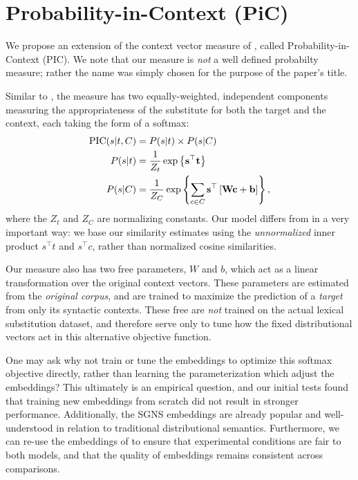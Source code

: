 \section{Probability-in-Context (PiC)}

We propose an extension of the context vector measure of
, called Probability-in-Context (PIC).  We note that
our measure is {\em not} a well defined probabilty measure; rather the name was
simply chosen for the purpose of the paper's title.

Similar to \balAddCos, the measure has two equally-weighted, independent
components measuring the appropriateness of the substitute for both the target
and the context, each taking the form of a softmax:
\begin{equation}
  \begin{aligned}
  \mbox{PIC}(s | t, C) &= P(s | t) \times P(s | C)\\
  P(s | t) &= \frac{1}{Z_t}\exp\left\{{\mathbf{s}}^\top {\mathbf{t}}\right\}\\
  P(s | C) &= \frac{1}{Z_C}\exp\left\{\sum_{c\in C}{\mathbf{s}}^\top\left[{{\mathbf{W}}}{\mathbf{c}} + {\mathbf{b}}\right]\right\},
  \end{aligned}
  \label{eqn:pic}
\end{equation}
where the $Z_t$ and $Z_C$ are normalizing constants.
Our model differs from \mbox{\balAddCos} in a very important way: we base our
similarity estimates using the {\em unnormalized} inner product $s^\top t$ and
$s^\top c$, rather than normalized cosine similarities.

Our measure also has two free parameters, $W$ and $b$, which act as a linear
transformation over the original context vectors. These parameters are
estimated from the {\em original corpus}, and are trained to maximize the
prediction of a {\em target} from only its syntactic contexts. These free
are {\em not} trained on the actual lexical substitution dataset, and
therefore serve only to tune how the fixed distributional vectors act in this
alternative objective function.

One may ask why not train or tune the embeddings to optimize this softmax
objective directly, rather than learning the parameterization which adjust the
embeddings? This ultimately is an empirical question, and our initial tests
found that training new embeddings from scratch did not result in stronger
performance. Additionally, the SGNS embeddings are already popular and
well-understood in relation to traditional distributional semantics.
Furthermore, we can re-use the embeddings of  to
ensure that experimental conditions are fair to both models, and that
the quality of embeddings remains consistent across comparisons.

